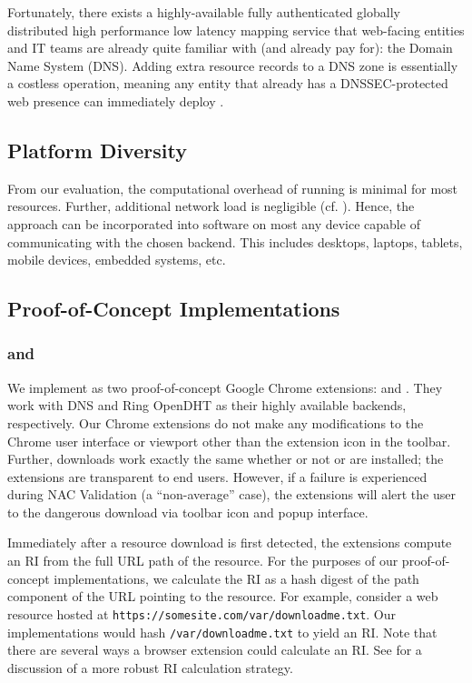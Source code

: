 Fortunately, there exists a highly-available fully authenticated globally
distributed high performance low latency mapping service that web-facing
entities and IT teams are already quite familiar with (and already pay for): the
Domain Name System (DNS). Adding extra resource records to a DNS zone is
essentially a costless operation, meaning any entity that already has a
DNSSEC-protected web presence can immediately deploy \SYSTEM{}.

\subsection{Platform Diversity}

From our evaluation, the computational overhead of running \SYSTEM{} is minimal
for most resources. Further, additional network load is negligible (cf.
). Hence, the \SYSTEM{} approach can be incorporated into
software on most any device capable of communicating with the chosen backend.
This includes desktops, laptops, tablets, mobile devices, embedded systems, etc.

\subsection{Proof-of-Concept Implementations}

\subsubsection{\DNSSYS{} and \DHTSYS{}}

We implement \SYSTEM{} as two proof-of-concept Google Chrome extensions:
\DNSSYS{} and \DHTSYS{}. They work with DNS and Ring OpenDHT as their highly
available backends, respectively. Our Chrome extensions do not make any
modifications to the Chrome user interface or viewport other than the extension
icon in the toolbar. Further, downloads work exactly the same whether or not
\DNSSYS{} or \DHTSYS{} are installed; the extensions are transparent to end
users. However, if a failure is experienced during NAC Validation (\ie a
``non-average'' case), the extensions will alert the user to the dangerous
download via toolbar icon and popup interface.

Immediately after a resource download is first detected, the extensions compute
an RI from the full URL path of the resource. For the purposes of our
proof-of-concept implementations, we calculate the RI as a hash digest of the
path component of the URL pointing to the resource. For example, consider a web
resource hosted at \texttt{https://somesite.com/var/downloadme.txt}. Our
implementations would hash \texttt{/var/downloadme.txt} to yield an RI. Note
that there are several ways a browser extension could calculate an RI. See
 for a discussion of a more robust RI calculation strategy.

